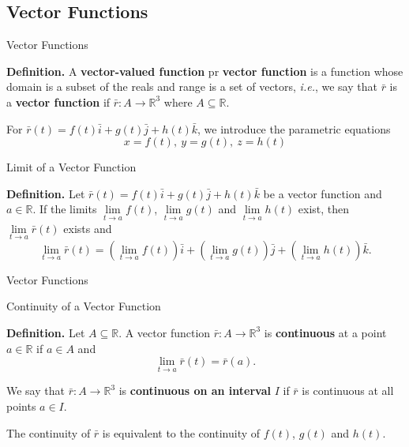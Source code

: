 \documentclass[aspectratio=169, UTF8]{ctexbeamer}
\begin{document}
    \subsection{Vector Functions}
    \begin{frame}[t]{Vector Functions}
        \begin{block}
            \par \textbf{Definition.} A \textbf{vector-valued function} pr \textbf{vector function} is a function whose domain is a subset of the reals and range is a set of vectors, \textit{i.e.}, we say that $\bar{r}$ is a \textbf{vector function} if $\bar{r}: A \to \mathbb{R}^3$ where $A \subseteq \mathbb{R}$.
        \end{block}

        \phantom{zjy}
        
        \par For $\bar{r} (t) = f(t) \bar{i} + g(t) \bar{j} + h(t) \bar{k}$, we introduce the parametric equations 
        \begin{equation*}
            x = f(t),\ y = g(t),\ z = h(t) 
        \end{equation*}

        \begin{block}{Limit of a Vector Function}
            \par \textbf{Definition.} Let $\bar{r}(t) = f(t) \bar{i} + g(t) \bar{j} + h(t) \bar{k}$ be a vector function and $a \in \mathbb{R}$. If the limits $\lim\limits_{t \to a}f(t)$, $\lim\limits_{t \to a}g(t)$ and $\lim\limits_{t \to a}h(t)$ exist, then $\lim\limits_{t \to a} \bar{r} (t)$ exists and 
            \begin{equation*}
                \lim _{t \rightarrow a} \bar{r}(t)=\left(\lim _{t \rightarrow a} f(t)\right) \bar{i}+\left(\lim _{t \rightarrow a} g(t)\right) \bar{j}+\left(\lim _{t \rightarrow a} h(t)\right) \bar{k} .
            \end{equation*}
        \end{block}
    \end{frame}

    \begin{frame}[t]{Vector Functions}
        \begin{block}{Continuity of a Vector Function}
            \par \textbf{Definition.} Let $A \subseteq \mathbb{R}$. A vector function $\bar{r}: A \to \mathbb{R}^3$ is \textbf{continuous} at a point $a \in \mathbb{R}$ if $a \in A$ and 
            \begin{equation*}
                \lim\limits_{t \to a}\bar{r} (t) = \bar{r} (a).
            \end{equation*}

            \phantom{zjy}

            \par We say that $\bar{r}: A \to \mathbb{R}^3$ is \textbf{continuous on an interval} $I$ if $\bar{r}$ is continuous at all points $a \in I$.
            \par The continuity of $\bar{r}$ is equivalent to the continuity of $f(t)$, $g(t)$ and $h(t)$.
        \end{block}
    \end{frame}
\end{document}
